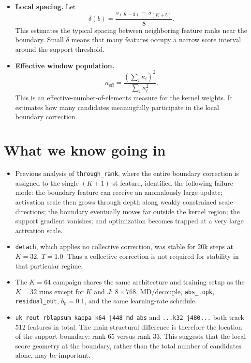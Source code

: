 \documentclass[11pt,a4paper]{article}
\newcommand{\code}[1]{\texttt{#1}}
\newcommand{\neff}{n_{\mathrm{eff}}}
\begin{document}
\begin{itemize}[leftmargin=1.4em]
A gradient-descent step in score space has the schematic form
\[
\Delta s_i
\propto
\kappa_i
\left(
w_i-\langle w\rangle_q
\right),
\]
where
\[
\langle w\rangle_q
=
\sum_i q_i w_i.
\]
Thus a near-boundary feature moves upward when it is preferred more strongly
than the kernel-weighted local average, and downward when it is preferred less.

\item \textbf{Local spacing.}
Let
\[
\delta(b)
=
\frac{s_{(K-3)}-s_{(K+5)}}{8}.
\]
This estimates the typical spacing between neighboring feature ranks near the
boundary. Small \(\delta\) means that many features occupy a narrow score
interval around the support threshold.

\item \textbf{Effective window population.}
\[
\neff
=
\frac{\left(\sum_i\kappa_i\right)^2}
{\sum_i\kappa_i^2}.
\]
This is an effective-number-of-elements measure for the kernel weights. It
estimates how many candidates meaningfully participate in the local boundary
correction.

\end{itemize}


\section{What we know going in}

\begin{itemize}[leftmargin=1.4em]

\item Previous analysis of \code{through\_rank}, where the entire boundary
correction is assigned to the single \((K+1)\)-st feature, identified the
following failure mode: the boundary feature can receive an anomalously large
update; activation scale then grows through depth along weakly constrained
scale directions; the boundary eventually moves far outside the kernel region;
the support gradient vanishes; and optimization becomes trapped at a very
large activation scale.

\item \code{detach}, which applies no collective correction, was stable for
20k steps at \(K=32,\ T=1.0\). Thus a collective correction is not required for
stability in that particular regime.

\item The \(K=64\) campaign shares the same architecture and training setup as
the \(K=32\) runs except for \(K\) and \(J\):
\(8\times768\), MD/decouple, \code{abs\_topk}, \code{residual\_out},
\(b_0=0.1\), and the same learning-rate schedule.

\item
\code{uk\_rout\_rblapsum\_kappa\_k64\_j448\_md\_abs}
and
\code{...k32\_j480...}
both track 512 features in total.
The main structural difference is therefore the location of the support
boundary: rank 65 versus rank 33.
This suggests that the local score geometry at the boundary, rather than the
total number of candidates alone, may be important.

\end{itemize}
\end{document}
